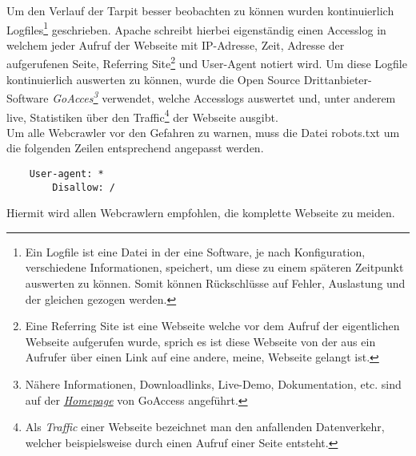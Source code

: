 Um den Verlauf der Tarpit besser beobachten zu können wurden kontinuierlich Logfiles\footnote{Ein Logfile ist eine Datei in der eine Software, je nach Konfiguration, verschiedene Informationen, speichert, um diese zu einem späteren Zeitpunkt auswerten zu können. Somit können Rückschlüsse auf Fehler, Auslastung und der gleichen gezogen werden.} geschrieben. Apache schreibt hierbei eigenständig einen Accesslog in welchem jeder Aufruf der Webseite mit IP-Adresse, Zeit, Adresse der aufgerufenen Seite, Referring Site\footnote{Eine Referring Site ist eine Webseite welche vor dem Aufruf der eigentlichen Webseite aufgerufen wurde, sprich es ist diese Webseite von der aus ein Aufrufer über einen Link auf eine andere, \glqq meine\grqq, Webseite gelangt ist.} und User-Agent notiert wird. Um diese Logfile kontinuierlich auswerten zu können, wurde die Open Source Drittanbieter-Software \emph{GoAcces\footnote{Nähere Informationen, Downloadlinks, Live-Demo, Dokumentation, etc. sind auf der \href{https://goaccess.io/}{\emph{Homepage}} von GoAccess angeführt.}} verwendet, welche Accesslogs auswertet und, unter anderem live, Statistiken über den Traffic\footnote{Als \emph{Traffic} einer Webseite bezeichnet man den anfallenden Datenverkehr, welcher beispielsweise durch einen Aufruf einer Seite entsteht.} der Webseite ausgibt.\\
Um alle Webcrawler vor den Gefahren zu warnen, muss die Datei robots.txt um die folgenden Zeilen entsprechend angepasst werden.
\begin{lstlisting}
	User-agent: *
		Disallow: /
\end{lstlisting}
Hiermit wird allen Webcrawlern empfohlen, die komplette Webseite zu meiden.
\label{umsetzung_grundlegendes}